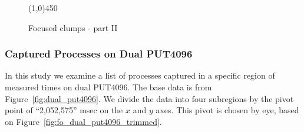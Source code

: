 \documentclass[10pt]{article}
\begin{document}
\begin{figure}[H]
{		\label{fig:fo_dual_put2048_trimmed}
	}
\begin{center}
\line(1,0){450}
\end{center}
	\caption{Focused clumps - part II~\label{fig:extra_clumps2}}
\end{figure}

\clearpage
\newpage

\subsubsection{Captured Processes on Dual PUT4096}
In this study we examine a list of processes captured in a specific region of measured times on dual PUT4096. 
The base data is from Figure~\ref{fig:dual_put4096}. 
We divide the data into four subregions by the pivot point of ``2,052,575'' msec on the $x$ and $y$ axes. 
This pivot is chosen by eye, based on Figure~\ref{fig:fo_dual_put4096_trimmed}. 
\end{document}
